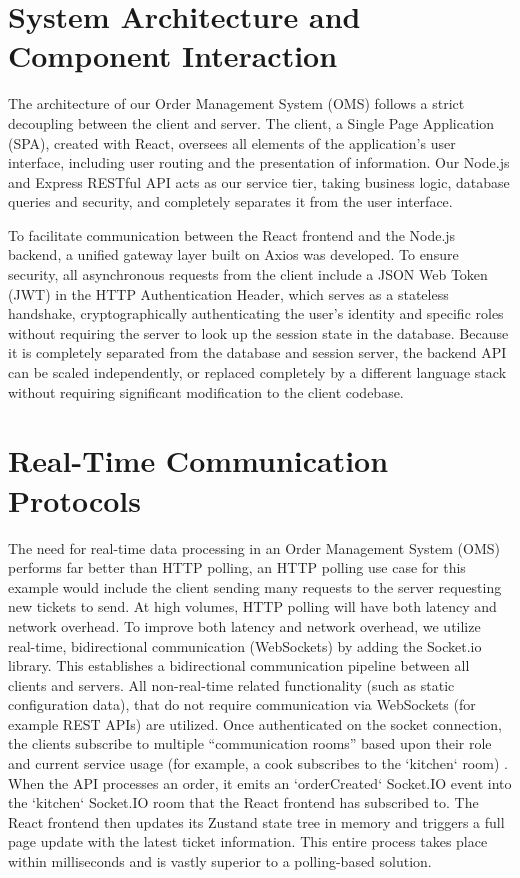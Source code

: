 \section{System Architecture and Component Interaction}

The architecture of our Order Management System (OMS) follows a strict decoupling between the client and server. The client, a Single Page Application (SPA), created with React, oversees all elements of the application's user interface, including user routing and the presentation of information. Our Node.js and Express RESTful API acts as our service tier, taking business logic, database queries and security, and completely separates it from the user interface.

To facilitate communication between the React frontend and the Node.js backend, a unified gateway layer built on Axios \cite{axios} was developed. To ensure security, all asynchronous requests from the client include a JSON Web Token (JWT) in the HTTP Authentication Header, which serves as a stateless handshake, cryptographically authenticating the user’s identity and specific roles without requiring the server to look up the session state in the database. Because it is completely separated from the database and session server, the backend API can be scaled independently, or replaced completely by a different language stack without requiring significant modification to the client codebase.

\section{Real-Time Communication Protocols}

The need for real-time data processing in an Order Management System (OMS) performs far better than HTTP polling, an HTTP polling use case for this example would include the client sending many requests to the server requesting new tickets to send. At high volumes, HTTP polling will have both latency and network overhead. To improve both latency and network overhead, we utilize real-time, bidirectional communication (WebSockets) by adding the Socket.io library. This establishes a bidirectional communication pipeline between all clients and servers. All non-real-time related functionality (such as static configuration data), that do not require communication via WebSockets (for example REST APIs) are utilized. Once authenticated on the socket connection, the clients subscribe to multiple ``communication rooms'' based upon their role and current service usage (for example, a cook subscribes to the `kitchen` room) \cite{socketio2024rooms}. When the API processes an order, it emits an `orderCreated` Socket.IO event into the `kitchen` Socket.IO room that the React frontend has subscribed to. The React frontend then updates its Zustand state tree in memory and triggers a full page update with the latest ticket information. This entire process takes place within milliseconds and is vastly superior to a polling-based solution.


